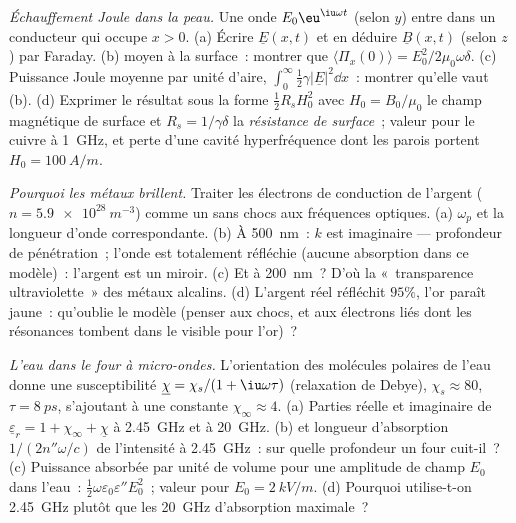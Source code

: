 \begin{exercise}[$\star\star\star$]\label{exo:b2:waves-in-media:10}
\emph{Échauffement Joule dans la peau.} Une onde $E_0\eu^{\iu\omega t}$ (selon $y$)
entre dans un conducteur qui occupe $x > 0$. (a) Écrire $\underline E(x, t)$ et en déduire
$\underline B(x, t)$ (selon $z$) par Faraday. (b)  moyen à la
surface~: montrer que $\langle\Pi_x(0)\rangle = E_0^2/2\mu_0\omega\delta$. (c) Puissance Joule
moyenne par unité d'aire, $\int_0^\infty\tfrac12\gamma|\underline E|^2\dd x$~: montrer qu'elle vaut
(b). (d) Exprimer le résultat sous la forme $\tfrac12R_sH_0^2$ avec $H_0 = B_0/\mu_0$ le
champ magnétique de surface et $R_s = 1/\gamma\delta$ la \emph{résistance
de surface}~; valeur pour le cuivre à \qty{1}{GHz}, et perte d'une
cavité hyperfréquence dont les parois portent $H_0 = \qty{100}{A/m}$.
\end{exercise}

\begin{exercise}[$\star\star\star$]\label{exo:b2:waves-in-media:11}
\emph{Pourquoi les métaux brillent.} Traiter les électrons de conduction de l'argent ($n =
\qty{5.9e28}{m^{-3}}$) comme un  sans chocs aux fréquences optiques.
(a) $\omega_p$ et la longueur d'onde correspondante. (b) À \qty{500}{nm}~: $k$ est
imaginaire --- profondeur de pénétration~; l'onde est totalement réfléchie (aucune
absorption dans ce modèle)~: l'argent est un miroir. (c) Et à \qty{200}{nm}~? D'où
la «~transparence ultraviolette~» des métaux alcalins. (d) L'argent réel
réfléchit $95\%$, l'or paraît jaune~: qu'oublie le modèle (penser aux
chocs, et aux électrons liés dont les résonances tombent dans le
visible pour l'or)~?
\end{exercise}

\begin{exercise}[$\star\star\star$]\label{exo:b2:waves-in-media:12}
\emph{L'eau dans le four à micro-ondes.} L'orientation des molécules polaires de l'eau
donne une susceptibilité $\underline\chi = \chi_s/(1 + \iu\omega\tau)$ (relaxation
de Debye), $\chi_s \approx 80$, $\tau = \qty{8}{ps}$, s'ajoutant à une constante
$\chi_\infty \approx 4$. (a) Parties réelle et imaginaire de $\underline\varepsilon_r = 1 + \chi_\infty
+ \underline\chi$ à \qty{2.45}{GHz} et à \qty{20}{GHz}. (b)  et
longueur d'absorption $1/(2n''\omega/c)$ de l'intensité à \qty{2.45}{GHz}~: sur quelle
profondeur un four cuit-il~? (c) Puissance absorbée par unité de volume pour une
amplitude de champ $E_0$ dans l'eau~: $\tfrac12\omega\varepsilon_0\varepsilon''E_0^2$~; valeur pour
$E_0 = \qty{2}{kV/m}$. (d) Pourquoi utilise-t-on \qty{2.45}{GHz} plutôt que les
\qty{20}{GHz} d'absorption maximale~?
\end{exercise}

